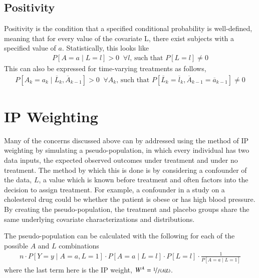       
\subsection{Positivity} 
Positivity is the condition that a specified conditional probability is well-defined, meaning that for every value of the covariate L, there exist subjects with a specified value of $a$.\cite{hernan2006estimating}  Statistically, this looks like 
\begin{align}
P[A=a \mid L=l] > 0 \;\; \forall l \text{, such that } P[L=l] \neq 0
\end{align} 
This can also be expressed for time-varying treatments as follows, 
\begin{align} 
P[A_k = a_k \mid \overline{L}_{k}, \overline{A}_{k-1}] > 0 \;\;  \forall A_k \text{, such that } P[\overline{L}_k = \overline{l}_k, \overline{A}_{k-1} = \overline{a}_{k-1} ] \neq 0
\end{align} 





\section{IP Weighting} \label{IP Weighting} 
Many of the concerns discussed above can by addressed using the method of IP weighting by simulating a pseudo-population, in which every individual has two data inputs, the expected observed outcomes under treatment and under no treatment.  The method by which this is done is by considering a confounder of the data, $L$, a value which is known before treatment and often factors into the decision to assign treatment.  For example, a confounder in a study on a cholesterol drug could be whether the patient is obese or has high blood pressure.  By creating the pseudo-population, the treatment and placebo groups share the same underlying covariate characterizations and distributions. 

The pseudo-population can be calculated with the following for each of the possible $A$ and $L$ combinations 
\begin{align} \label{eq:1}
n\cdot P[Y=y \mid A = a, L= 1] \cdot P[A=a \mid L=l]  \cdot P[L=l] \cdot \frac{1}{P[A = a \mid L = 1]} \end{align}  
where the last term here is the IP weight, $W^{A} = \nicefrac{1}{f(A\mid L)}$.  

